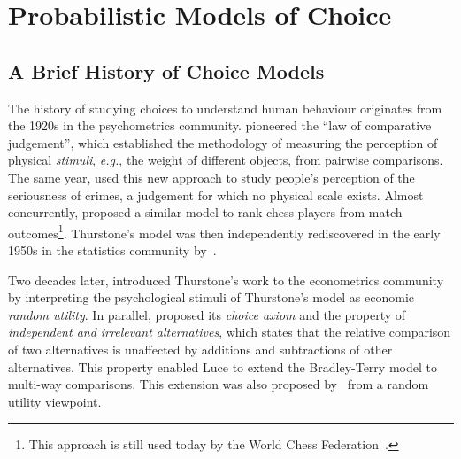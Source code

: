 \section{Probabilistic Models of Choice}
\label{in:sec:models}

\subsection{A Brief History of Choice Models}

The history of studying choices to understand human behaviour originates from the 1920s in the psychometrics community.
\citet{thurstone1927law} pioneered the ``law of comparative judgement'', which established the methodology of measuring the perception of physical \emph{stimuli}, \textit{e.g.}, the weight of different objects, from pairwise comparisons.
The same year, \citet{thurstone1927method} used this new approach to study people's perception of the seriousness of crimes, a judgement for which no physical scale exists.
Almost concurrently, \citet{zermelo1928berechnung} proposed a similar model to rank chess players from match outcomes\footnote{This approach is still used today by the World Chess Federation~\citep{elo1978rating}.}.
Thurstone's model was then independently rediscovered in the early 1950s in the statistics community by~\citet{bradley1952rank}.

Two decades later, \citet{marschak1959binary} introduced Thurstone's work to the econometrics community by interpreting the psychological stimuli of Thurstone's model as economic \emph{random utility}.
In parallel, \cite{luce1959individual} proposed its \emph{choice axiom} and the property of \emph{independent and irrelevant alternatives}, which states that the relative comparison of two alternatives is unaffected by additions and subtractions of other alternatives.
This property enabled Luce to extend the Bradley-Terry model to multi-way comparisons.
This extension was also proposed by~\citet{mcfadden1973conditional} from a random utility viewpoint.

